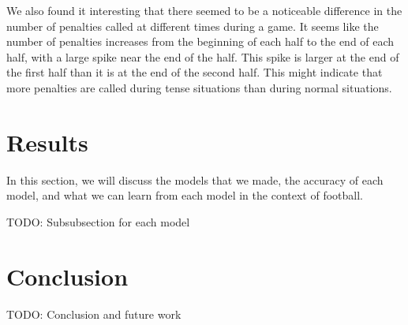 \documentclass[sigconf, nonacm]{acmart}
\begin{document}
We also found it interesting that there seemed to be a noticeable difference in
the number of penalties called at different times during a game. It seems like
the number of penalties increases from the beginning of each half to the end of
each half, with a large spike near the end of the half. This spike is larger at
the end of the first half than it is at the end of the second half. This might
indicate that more penalties are called during tense situations than during
normal situations.

\section{Results}

In this section, we will discuss the models that we made, the accuracy of each
model, and what we can learn from each model in the context of football.

TODO: Subsubsection for each model

\section{Conclusion}

TODO: Conclusion and future work



\end{document}
